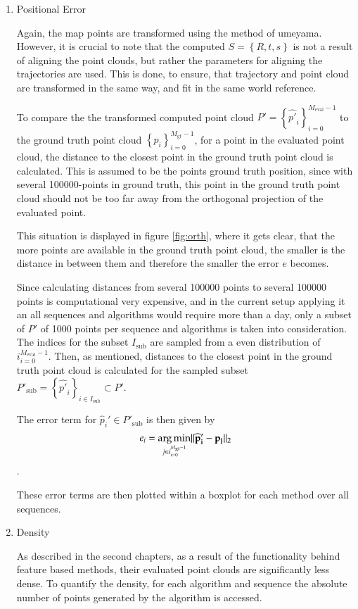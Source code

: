 	\begin{enumerate}
	\item{Positional Error}
	
	Again, the map points are transformed using the method of umeyama. However, it is crucial to note that the computed 
	$S = \left\{R,t,s\right\}$ is not a result of aligning the point clouds, but rather the parameters for aligning the trajectories 
	are used. This is done, to ensure, that trajectory and point cloud are transformed in the same way, and fit in the same world reference. 
	
	To compare the the transformed computed point cloud $P' = \left\{{\widehat{p'}_i}\right\}_{i=0}^{M_{\text{eval}}-1}$ to the ground truth point cloud
	$\left\{p_i\right\}_{i=0}^{M_{\text{gt}}-1}$, for a point in the evaluated point cloud, the distance to the closest point in the ground truth
	point cloud is calculated. This is assumed to be the points ground truth position, since with several 100000-points in ground truth, this point in 
	the ground truth point cloud should not be too far away from the orthogonal projection of the evaluated point. 
	
	
	This situation is displayed in figure \ref{fig:orth}, where it gets clear, that the more points are available in the ground truth point cloud, 
	the smaller is the distance in between them and therefore the smaller the error $e$ becomes.

	Since calculating distances from several 100000 points to several 100000 points is computational very expensive, and in the current setup applying 
	it an all sequences and algorithms would require more than a day, only a subset of $P'$ of 1000 points per sequence and algorithms
	is taken into consideration. The indices for the subset $I_{\text{sub}}$ are sampled from a even distribution of ${i}_{i = 0}^{M_{\text{eval}}-1}$. 
	Then, as mentioned, distances to the closest point in the ground truth point cloud is calculated for the sampled subset 
	$P'_{\text{sub}} = \left\{{\widehat{p'}_i}\right\}_{i \in I_{\text{sub}}} \subset P'$. 
	
	The error term for $\widehat{p}_i' \in P'_{\text{sub}}$ is then given by
	$$ e_i = \mathop{\mathrm{arg\,min}}_{j \in {i}_{i=0}^{M_{\text{gt}}-1}} \lVert \mathbf{\widehat{p}_i' - p_j} \rVert_2 $$.
	
	These error terms are then plotted within a boxplot for each method over all sequences. 
	
	\item{Density}
	
	As described in the second chapters, as a result of the functionality behind feature based methods, their evaluated point clouds are 
	significantly less dense. To quantify the density, for each algorithm and sequence the absolute number of points generated by the 
	algorithm is accessed. 
	
	\end{enumerate}
	
